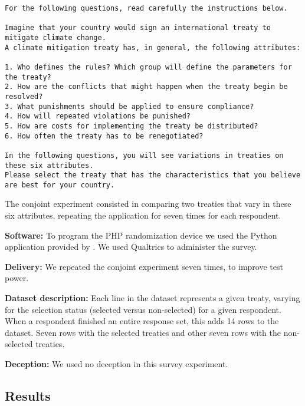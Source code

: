 \documentclass[12pt,a4paper,]{article}
\begin{document}
\vspace{.5cm}

\begin{verbatim}
For the following questions, read carefully the instructions below.
 
Imagine that your country would sign an international treaty to mitigate climate change. 
A climate mitigation treaty has, in general, the following attributes:
 
1. Who defines the rules? Which group will define the parameters for the treaty?
2. How are the conflicts that might happen when the treaty begin be resolved?
3. What punishments should be applied to ensure compliance?
4. How will repeated violations be punished?
5. How are costs for implementing the treaty be distributed?
6. How often the treaty has to be renegotiated?

In the following questions, you will see variations in treaties on these six attributes.
Please select the treaty that has the characteristics that you believe are best for your country.
\end{verbatim}

\vspace{.5cm}

The conjoint experiment consisted in comparing two treaties that vary in
these six attributes, repeating the application for seven times for each
respondent.

\noindent \textbf{Software:} To program the PHP randomization device we
used the Python application provided by \citet{strezhnev2013conjoint}.
We used Qualtrics to administer the survey.

\noindent \textbf{Delivery:} We repeated the conjoint experiment seven
times, to improve test power.

\noindent \textbf{Dataset description:} Each line in the dataset
represents a given treaty, varying for the selection status (selected
versus non-selected) for a given respondent. When a respondent finished
an entire response set, this adds 14 rows to the dataset. Seven rows
with the selected treaties and other seven rows with the non-selected
treaties.

\noindent \textbf{Deception:} We used no deception in this survey
experiment.

\hypertarget{results}{%
\subsection{Results}\label{results}}
\end{document}
